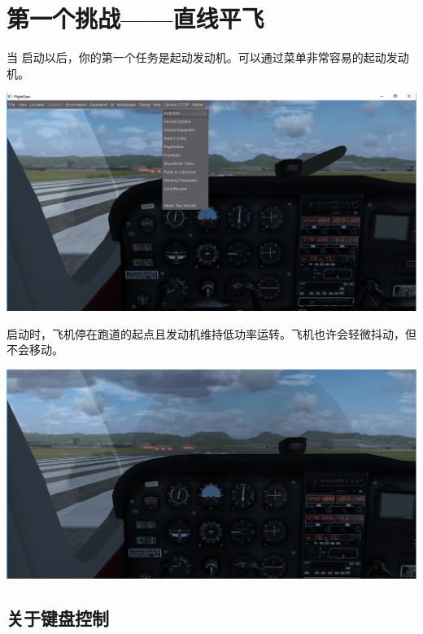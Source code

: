 \newpage


\ifchinese
\section{第一个挑战——直线平飞}\label{sec:FlyingStraight}

当 \FlightGear{} 启动以后，你的第一个任务是起动发动机。可以通过菜单非常容易的起动发动机。
\medskip

\centerline{
  \includegraphics[clip,width=15.0cm]{img/basic_tutorial/autostart}
}
\medskip

启动时，飞机停在跑道的起点且发动机维持低功率运转。飞机也许会轻微抖动，但不会移动。

\medskip

\centerline{
  \includegraphics[clip,width=15.0cm]{img/basic_tutorial/on-runway}
}
\medskip

\subsection*{关于键盘控制}

